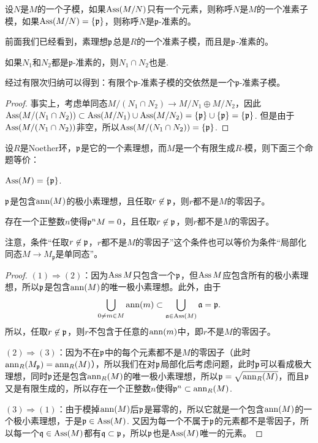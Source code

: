 \begin{para}
设$N$是$M$的一个子模，如果$\operatorname{Ass}(M/N)$只有一个元素，则称呼$N$是$M$的一个准素子模，如果$\operatorname{Ass}(M/N)=\{\mathfrak{p}\}$，则称呼$N$是$\mathfrak{p}$-准素的。
\end{para}

前面我们已经看到，素理想$\mathfrak{p}$总是$R$的一个准素子模，而且是$\mathfrak{p}$-准素的。

\begin{lem}
	如果$N_1$和$N_2$都是$\mathfrak{p}$-准素的，则$N_1\cap N_2$也是. 
\end{lem}

经过有限次归纳可以得到：有限个$\mathfrak{p}$-准素子模的交依然是一个$\mathfrak{p}$-准素子模。

\begin{proof}
	事实上，考虑单同态$M/(N_1\cap N_2)\to M/N_1\oplus M/N_2$，因此$\operatorname{Ass}(M/(N_1\cap N_2))\subset \operatorname{Ass}(M/N_1)\cup \operatorname{Ass}(M/N_2)=\{\mathfrak{p}\}\cup \{\mathfrak{p}\}=\{\mathfrak{p}\}$. 但是由于$\operatorname{Ass}(M/(N_1\cap N_2))$非空，所以$\operatorname{Ass}(M/(N_1\cap N_2))=\{\mathfrak{p}\}$. 
\end{proof}

\begin{pro}\label{pro:5.1.11}
设$R$是Noether环，$\mathfrak{p}$是它的一个素理想，而$M$是一个有限生成$R$-模，则下面三个命题等价：
\begin{compactenum}[~~~(1)]
\item $\operatorname{Ass}(M)=\{\mathfrak{p}\}$.
\item $\mathfrak{p}$是包含$\operatorname{ann}(M)$的极小素理想，且任取$r\not\in \mathfrak{p}$，则$r$都不是$M$的零因子。
\item 存在一个正整数$n$使得$\mathfrak{p}^n M=0$，且任取$r\not\in \mathfrak{p}$，则$r$都不是$M$的零因子。
\end{compactenum}
\end{pro}

注意，条件“任取$r\not\in \mathfrak{p}$，$r$都不是$M$的零因子”这个条件也可以等价为条件“局部化同态$M\to M_{\mathfrak p}$是单同态”。

\begin{proof}
$(1)\Rightarrow (2)$：因为$\operatorname{Ass} M$只包含一个$\mathfrak{p}$，但$\operatorname{Ass} M$应包含所有的极小素理想，所以$\mathfrak{p}$是包含$\operatorname{ann}(M)$的唯一极小素理想。此外，由于
\[
	\bigcup_{0\neq m\in M}\operatorname{ann}(m)\subset \bigcup_{\mathfrak{a}\in \operatorname{Ass}(M)}\mathfrak{a}=\mathfrak{p}. 
\]
所以，任取$r\not\in \mathfrak{p}$，则$r$不包含于任意的$\operatorname{ann}(m)$中，即$r$不是$M$的零因子。

$(2)\Rightarrow (3)$：因为不在$\mathfrak{p}$中的每个元素都不是$M$的零因子（此时$\operatorname{ann}_R(M_{\mathfrak{p}})=\operatorname{ann}_R(M)$），所以我们在对$\mathfrak{p}$局部化后考虑问题，此时$\mathfrak{p}$可以看成极大理想，同时$\mathfrak{p}$还是包含$\operatorname{ann}_R(M)$的唯一极小素理想，所以$\mathfrak{p}=\sqrt{\operatorname{ann}_R(M)}$，而且$\mathfrak{p}$又是有限生成的，所以存在一个正整数$n$使得$\mathfrak{p}^n\subset \operatorname{ann}_R(M)$. 

$(3)\Rightarrow (1)$：由于模掉$\operatorname{ann}(M)$后$\mathfrak{p}$是幂零的，所以它就是一个包含$\operatorname{ann}(M)$的一个极小素理想，于是$\mathfrak{p} \in \operatorname{Ass}(M)$. 又因为每一个不属于$\mathfrak{p}$的元素都不是零因子，所以每一个$\mathfrak{q}\in \operatorname{Ass}(M)$都有$\mathfrak{q}\subset \mathfrak{p}$，所以$\mathfrak{p}$也是$\operatorname{Ass}(M)$唯一的元素。
\end{proof}

